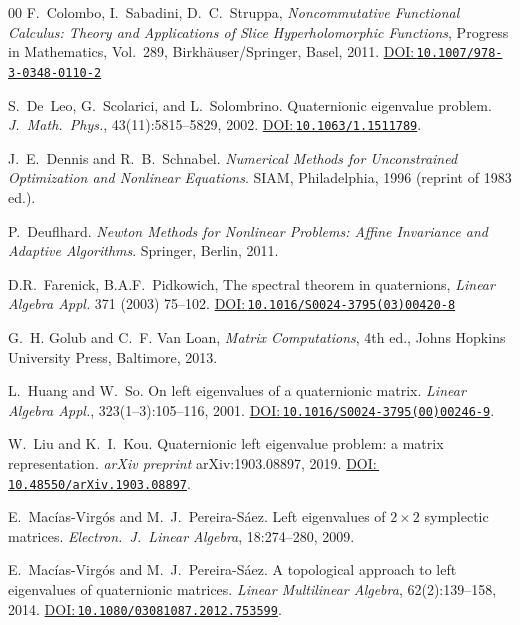 \documentclass[preprint,12pt]{elsarticle}  %
\theoremstyle{definition}
\theoremstyle{definition}
\theoremstyle{definition}
\theoremstyle{definition}
\theoremstyle{definition}
\theoremstyle{remark}
\theoremstyle{remark}
\theoremstyle{remark}
\newcommand{\DOI}[1]{\href{https://doi.org/#1}{DOI:\,\nolinkurl{#1}}}
\begin{document}
\begin{thebibliography}{00}
F.~Colombo, I.~Sabadini, D.~C.~Struppa,
\emph{Noncommutative Functional Calculus: Theory and Applications of Slice Hyperholomorphic Functions},
Progress in Mathematics, Vol.~289,
Birkh\"auser/Springer, Basel, 2011.
\DOI{10.1007/978-3-0348-0110-2}

S.~De~Leo, G.~Scolarici, and L.~Solombrino.
\newblock Quaternionic eigenvalue problem.
\newblock \emph{J.\ Math.\ Phys.}, 43(11):5815--5829, 2002.
\newblock \DOI{10.1063/1.1511789}.

J.~E.~Dennis and R.~B.~Schnabel.
\newblock \emph{Numerical Methods for Unconstrained Optimization and Nonlinear Equations}.
\newblock SIAM, Philadelphia, 1996 (reprint of 1983 ed.).

P.~Deuflhard.
\newblock \emph{Newton Methods for Nonlinear Problems: Affine Invariance and Adaptive Algorithms}.
\newblock Springer, Berlin, 2011.

D.R.~Farenick, B.A.F.~Pidkowich,
\newblock The spectral theorem in quaternions,
\newblock \emph{Linear Algebra Appl.} 371 (2003) 75--102.
\newblock \DOI{10.1016/S0024-3795(03)00420-8}

G.~H. Golub and C.~F. Van Loan,
\emph{Matrix Computations}, 4th ed.,
Johns Hopkins University Press, Baltimore, 2013.

L.~Huang and W.~So.
\newblock On left eigenvalues of a quaternionic matrix.
\newblock \emph{Linear Algebra Appl.}, 323(1--3):105--116, 2001.
\newblock \DOI{10.1016/S0024-3795(00)00246-9}.

W.~Liu and K.~I.~Kou.
\newblock Quaternionic left eigenvalue problem: a matrix representation.
\newblock \emph{arXiv preprint} arXiv:1903.08897, 2019.
\newblock \DOI{10.48550/arXiv.1903.08897}.

E.~Mac{\'i}as-Virg{\'o}s and M.~J.~Pereira-S{\'a}ez.
\newblock Left eigenvalues of $2\times 2$ symplectic matrices.
\newblock \emph{Electron.\ J.\ Linear Algebra}, 18:274--280, 2009.

E.~Mac{\'i}as-Virg{\'o}s and M.~J.~Pereira-S{\'a}ez.
\newblock A topological approach to left eigenvalues of quaternionic matrices.
\newblock \emph{Linear Multilinear Algebra}, 62(2):139--158, 2014.
\newblock \DOI{10.1080/03081087.2012.753599}.


\end{thebibliography}
\end{document}
